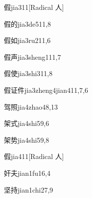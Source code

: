 \begin{entry}{假}{jia3}{11}[Radical 人]
\end{entry}

\begin{entry}{假的}{jia3de5}{11,8}
\end{entry}

\begin{entry}{假如}{jia3ru2}{11,6}
\end{entry}

\begin{entry}{假声}{jia3sheng1}{11,7}
\end{entry}

\begin{entry}{假使}{jia3shi3}{11,8}
\end{entry}

\begin{entry}{假证件}{jia3zheng4jian4}{11,7,6}
\end{entry}

\begin{entry}{驾照}{jia4zhao4}{8,13}
\end{entry}

\begin{entry}{架式}{jia4shi5}{9,6}
\end{entry}

\begin{entry}{架势}{jia4shi5}{9,8}
\end{entry}

\begin{entry}{假}{jia4}{11}[Radical 人]
\end{entry}

\begin{entry}{奸夫}{jian1fu1}{6,4}
\end{entry}

\begin{entry}{坚持}{jian1chi2}{7,9}
\end{entry}

